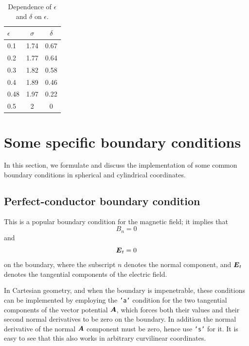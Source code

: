 \documentclass[\mydriver,12pt,twoside,notitlepage,a4paper]{article}
\newcommand{\code}[1]{\texttt{#1}}
\renewcommand{\vec}[1]{\mbox{\boldmath{$#1$}}}
\begin{document}
\begin{table}[htb]
  \begin{center}
    \caption{
      Dependence of $\epsilon$ and $\delta$ on $\epsilon$.
    }
    \label{Tplanetsoltn}
    \begin{tabular}{lcc}
    \toprule
$\epsilon$ & $\sigma$ & $\delta$ \\
    \midrule
 0.1 & 1.74 & 0.67 \\
 0.2 & 1.77 & 0.64 \\
 0.3 & 1.82 & 0.58 \\
 0.4 & 1.89 & 0.46 \\
 0.48& 1.97 & 0.22 \\
 0.5 &  2   &  0   \\
    \bottomrule
    \end{tabular}
  \end{center}
\end{table}


\section{Some specific boundary conditions}
\label{s-boundary-conditions}

In this section, we formulate and discuss the implementation of some
common boundary conditions in spherical and cylindrical coordinates.

\subsection{Perfect-conductor boundary condition}

This is a popular boundary condition for the magnetic field; it implies that
\begin{equation}
  \label{Eq-boundcond-perfcond-1}
  B_n = 0
\end{equation}
and
\begin{equation}
  \vec{E}_t = 0
\end{equation}
on the boundary, where the subscript $n$ denotes the normal component, and
$\vec{E}_t$ denotes the tangential components of the electric field.

In Cartesian geometry, and when the boundary is impenetrable, these conditions can be implemented by employing the \code{'a'} condition for
the two tangential components of the vector potential $\vec{A}$, which forces both their values 
and their second normal derivatives to be zero on the boundary.
In addition the normal derivative of the normal $\vec{A}$ component must be zero, hence use \code{'s'} for it.
It is easy to see that this also works in arbitrary curvilinear
coordinates.
\end{document}
